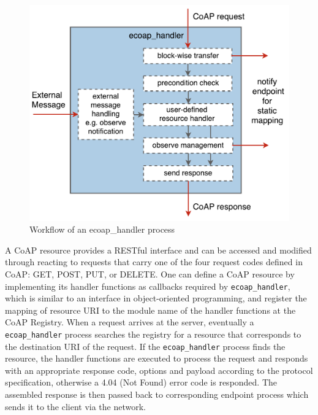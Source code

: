 \begin{figure}[!htbp]
\centering
\includegraphics[scale = 0.55]{ecoap_handler}
\caption{Workflow of an ecoap\_handler process}
\label{fig:ecoap_handler}
\end{figure}

A CoAP resource provides a RESTful interface and can be accessed and modified through reacting to requests that carry one of the four request codes defined in CoAP: GET, POST, PUT, or DELETE. One can define a CoAP resource by implementing its handler functions as callbacks required by \verb|ecoap_handler|, which is similar to an interface in object-oriented programming, and register the mapping of resource URI to the module name of the handler functions at the CoAP Registry. When a request arrives at the server, eventually a \verb|ecoap_handler| process searches the registry for a resource that corresponds to the destination URI of the request. If the \verb|ecoap_handler| process finds the resource, the handler functions are executed to process the request and responds with an appropriate response code, options and payload according to the protocol specification, otherwise a 4.04 (Not Found) error code is responded. The assembled response is then passed back to corresponding endpoint process which sends it to the client via the network. 

